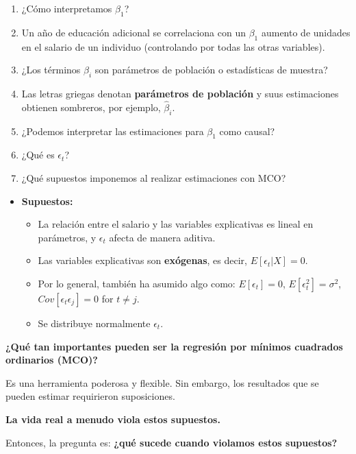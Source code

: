 \documentclass[
]{book}
\providecommand{\tightlist}{%
  \setlength{\itemsep}{0pt}\setlength{\parskip}{0pt}}
\begin{document}
\begin{enumerate}
\def\labelenumi{\arabic{enumi}.}
\tightlist
\item
  ¿Cómo interpretamos \(\beta_{1}\)?
\item
  Un año de educación adicional se correlaciona con un \(\beta_{1}\) aumento de unidades en el salario de un individuo (controlando por todas las otras variables).
\item
  ¿Los términos \(\beta_{i}\) son parámetros de población o estadísticas de muestra?
\item
  Las letras griegas denotan \textbf{parámetros de población} y suus estimaciones obtienen sombreros, por ejemplo, \(\hat{\beta}_i\).
\item
  ¿Podemos interpretar las estimaciones para \(\beta_{1}\) como causal?
\item
  ¿Qué es \(\epsilon_{t}\)?
\item
  ¿Qué supuestos imponemos al realizar estimaciones con MCO?
\end{enumerate}

\begin{itemize}
\tightlist
\item
  \textbf{Supuestos:}

  \begin{itemize}
  \tightlist
  \item
    La relación entre el salario y las variables explicativas es lineal en parámetros, y \(\epsilon_{t}\) afecta de manera aditiva.
  \item
    Las variables explicativas son \textbf{exógenas}, es decir, \(E[\epsilon_{t}|X] = 0\).
  \item
    Por lo general, también ha asumido algo como: \(E[\epsilon_{t}] = 0\), \(E[\epsilon_t^2] = \sigma^2\), \(Cov[\epsilon_t \epsilon_j] = 0\) for \(t \neq j\).
  \item
    Se distribuye normalmente \(\epsilon_t\).
  \end{itemize}
\end{itemize}

\textbf{¿Qué tan importantes pueden ser la regresión por mínimos cuadrados ordinarios (MCO)?}

Es una herramienta poderosa y flexible. Sin embargo, los resultados que se pueden estimar requirieron suposiciones.

\textbf{La vida real a menudo viola estos supuestos.}

Entonces, la pregunta es: \textbf{¿qué sucede cuando violamos estos supuestos?}
\end{document}
